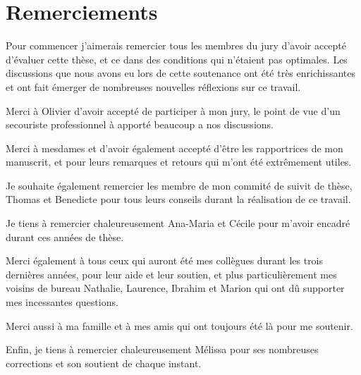 \section*{Remerciements}

Pour commencer j'aimerais remercier tous les membres du jury d'avoir
accepté d'évaluer cette thèse, et ce dans des conditions qui n'étaient
pas optimales. Les discussions que nous avons eu lors de cette
soutenance ont été très enrichissantes et ont fait émerger de
nombreuses nouvelles réflexions sur ce travail.

Merci à Olivier d'avoir accepté de participer à mon jury, le point de
vue d'un secouriste professionnel à apporté beaucoup a nos discussions.  

Merci à mesdames  et  d'avoir
également accepté d'être les rapportrices de mon manuscrit, et pour
leurs remarques et retours qui m'ont été extrêmement utiles.

Je souhaite également remercier les membre de mon commité de suivit de
thèse, Thomas  et Benedicte  pour tous
leurs conseils durant la réalisation de ce travail.

Je tiens à remercier chaleureusement Ana-Maria et Cécile pour m'avoir
encadré durant ces années de thèse.

Merci également à tous ceux qui auront été mes collègues durant les
trois dernières années, pour leur aide et leur soutien, et plus
particulièrement mes voisins de bureau Nathalie, Laurence, Ibrahim et
Marion qui ont dû supporter mes incessantes questions.

Merci aussi à ma famille et à mes amis qui ont toujours été là pour me
soutenir.

Enfin, je tiens à remercier chaleureusement Mélissa pour ses
nombreuses corrections et son soutient de chaque instant.